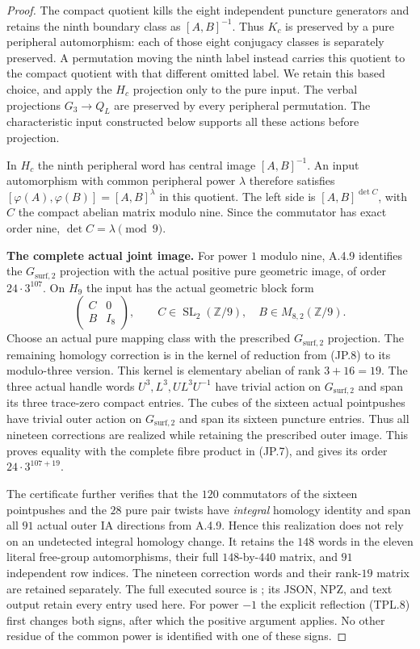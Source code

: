 \begin{proof}
The compact quotient kills the eight independent puncture generators
and retains the ninth boundary class as $[A,B]^{-1}$.  Thus $K_c$
is preserved by a pure peripheral automorphism: each of those eight
conjugacy classes is separately preserved.  A permutation moving
the ninth label instead carries this quotient to the compact
quotient with that different omitted label.  We retain this based
choice, and apply the $H_c$ projection only to the pure input.
The verbal projections $G_3\to Q_L$ are preserved by every
peripheral permutation.  The characteristic input constructed
below supports all these actions before projection.

In $H_c$ the ninth peripheral word has central image
$[A,B]^{-1}$.  An input automorphism with common peripheral
power $\lambda$ therefore satisfies
$[\varphi(A),\varphi(B)]=[A,B]^\lambda$ in this quotient.
The left side is $[A,B]^{\det C}$, with $C$ the compact
abelian matrix modulo nine.  Since the commutator has exact
order nine, $\det C=\lambda\pmod9$.

\par\medskip\noindent\textbf{The complete actual joint image.}\quad
For power $1$ modulo nine, A.4.9 identifies the
$G_{\mathrm{surf},2}$ projection with the actual positive pure
geometric image, of order $24\cdot3^{107}$.  On $H_9$ the input
has the actual geometric block form
\[
 \begin{pmatrix}C&0\\B&I_8\end{pmatrix},\qquad
 C\in\operatorname{SL}_2(\mathbb Z/9),\quad
 B\in M_{8,2}(\mathbb Z/9).                              \tag{JP.8}
\]
Choose an actual pure mapping class with the prescribed
$G_{\mathrm{surf},2}$ projection.  The remaining homology
correction is in the kernel of reduction from (JP.8) to its
modulo-three version.  This kernel is elementary abelian of
rank $3+16=19$.  The three actual handle words
$U^3,L^3,UL^3U^{-1}$ have trivial action on
$G_{\mathrm{surf},2}$ and span its three trace-zero compact
entries.  The cubes of the sixteen actual pointpushes have
trivial outer action on $G_{\mathrm{surf},2}$ and span its
sixteen puncture entries.  Thus all nineteen corrections are
realized while retaining the prescribed outer image.  This
proves equality with the complete fibre product in (JP.7),
and gives its order $24\cdot3^{107+19}$.

The certificate further verifies that the $120$ commutators of
the sixteen pointpushes and the $28$ pure pair twists have
\emph{integral} homology identity and span all $91$ actual outer
IA directions from A.4.9.  Hence this realization does not rely
on an undetected integral homology change.  It retains the
$148$ words in the eleven literal free-group automorphisms,
their full $148$-by-$440$ matrix, and $91$ independent row
indices.  The nineteen correction words and their rank-$19$
matrix are retained separately.  The full executed source is
; its JSON, NPZ,
and text output retain every entry used here.
For power $-1$ the explicit reflection (TPL.8) first changes
both signs, after which the positive argument applies.
No other residue of the common power is identified with one
of these signs.


\end{proof}
